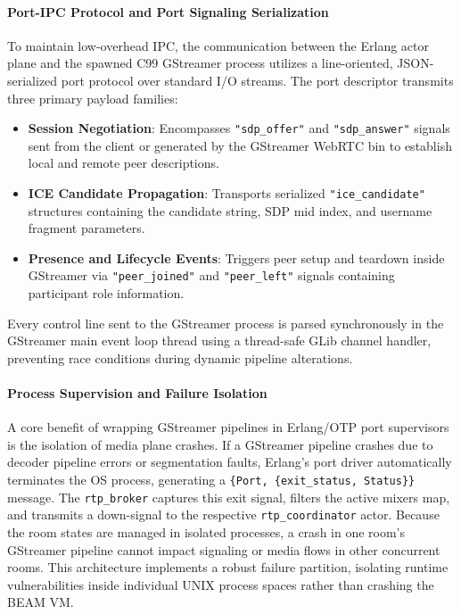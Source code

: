 \documentclass{article}
\begin{document}
\paragraph{Port-IPC Protocol and Port Signaling Serialization}

To maintain low-overhead IPC, the communication between the Erlang actor plane and the
spawned C99 GStreamer process utilizes a line-oriented, JSON-serialized port protocol
over standard I/O streams. The port descriptor transmits three primary payload families:

\begin{itemize}
    \item \textbf{Session Negotiation}: Encompasses \texttt{"sdp\_offer"} and \texttt{"sdp\_answer"}
          signals sent from the client or generated by the GStreamer WebRTC bin to establish local
          and remote peer descriptions.
    \item \textbf{ICE Candidate Propagation}: Transports serialized \texttt{"ice\_candidate"}
          structures containing the candidate string, SDP mid index, and username fragment parameters.
    \item \textbf{Presence and Lifecycle Events}: Triggers peer setup and teardown inside
          GStreamer via \texttt{"peer\_joined"} and \texttt{"peer\_left"} signals containing participant role information.
\end{itemize}

Every control line sent to the GStreamer process is parsed synchronously in the GStreamer
main event loop thread using a thread-safe GLib channel handler, preventing race
conditions during dynamic pipeline alterations.

\paragraph{Process Supervision and Failure Isolation}

A core benefit of wrapping GStreamer pipelines in Erlang/OTP port supervisors is the isolation of media plane crashes.
If a GStreamer pipeline crashes due to decoder pipeline errors or segmentation faults, Erlang's port driver automatically
terminates the OS process, generating a \texttt{\{Port, \{exit\_status, Status\}\}} message.
The \texttt{rtp\_broker} captures this exit signal, filters the active mixers map,
and transmits a down-signal to the respective \texttt{rtp\_coordinator} actor.
Because the room states are managed in isolated processes, a crash in one room's GStreamer
pipeline cannot impact signaling or media flows in other concurrent rooms. This architecture
implements a robust failure partition, isolating runtime vulnerabilities inside individual
UNIX process spaces rather than crashing the BEAM VM.
\end{document}
